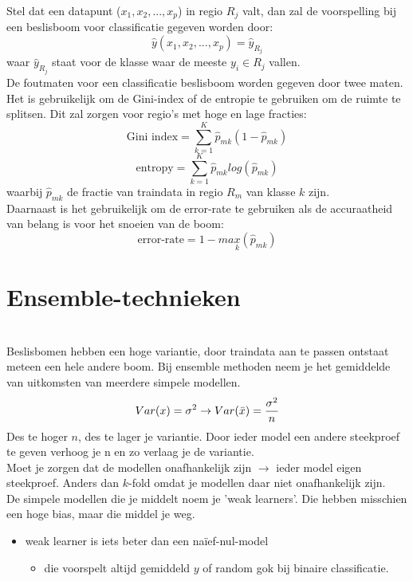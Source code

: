 {\noindent Stel dat een datapunt ($x_1,x_2,...,x_p$) in regio $R_j$ valt, dan zal de voorspelling bij een beslisboom voor classificatie gegeven worden door:
\[\hat{y}(x_1,x_2,...,x_p)=\hat{y}_{R_j}\]
waar $\hat{y}_{R_j}$ staat voor de klasse waar de meeste $y_i\in R_j$ vallen.\\

\noindent De foutmaten voor een classificatie beslisboom worden gegeven door twee maten. Het is gebruikelijk om de Gini-index of de entropie te gebruiken om de ruimte te splitsen. Dit zal zorgen voor regio’s met hoge en lage fracties:
\[\textrm{Gini index}= \sum\limits_{k=1}^K\hat{p}_{mk}(1-\hat{p}_{mk})\]
\[\textrm{entropy}=\sum\limits_{k=1}^K\hat{p}_{mk}log(\hat{p}_{mk})\]
waarbij $\hat{p}_{mk}$ de fractie van traindata in regio $R_m$ van klasse $k$ zijn.\\

\noindent Daarnaast is het gebruikelijk om de error-rate te gebruiken als de accuraatheid van belang is voor het snoeien van de boom:
\[\textrm{error-rate}=1-max\limits_{k}(\hat{p}_{mk})\]

\section{Ensemble-technieken}\\
Beslisbomen hebben een hoge variantie, door traindata aan te passen ontstaat meteen een hele andere boom. Bij ensemble methoden neem je het gemiddelde van uitkomsten van meerdere simpele modellen.\\
\[Var(x)=\sigma^2 \rightarrow Var(\Bar{x})=\frac{\sigma^2}{n}\]
Des te hoger $n$, des te lager je variantie. Door ieder model een andere steekproef te geven verhoog je n en zo verlaag je de variantie.\\

\noindent Moet je zorgen dat de modellen onafhankelijk zijn $\rightarrow$ ieder model eigen steekproef. Anders dan $k$-fold omdat je modellen daar niet onafhankelijk zijn.\\

\noindent De simpele modellen die je middelt noem je 'weak learners'. Die hebben misschien een hoge bias, maar die middel je weg.
\begin{itemize}
    \item weak learner is iets beter dan een naïef-nul-model
    \begin{itemize}
        \item die voorspelt altijd gemiddeld $y$ of random gok bij binaire classificatie.
    \end{itemize}
\end{itemize}

}
